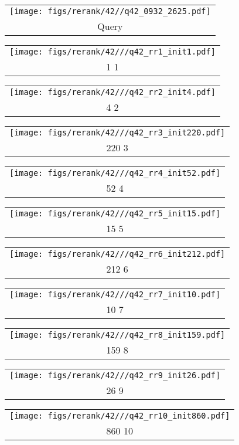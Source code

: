 \begin{figure*}[t]
\begin{tabular}{@{\sssp}c@{\sssp}}\texttt{[image: figs/rerank/42//q42\_0932\_2625.pdf]}\\Query\\ \end{tabular} 
\begin{tabular}{@{\sssp}c@{\sssp}}\texttt{[image: figs/rerank/42///q42\_rr1\_init1.pdf]}\\1  1\\ \end{tabular} 
\begin{tabular}{@{\sssp}c@{\sssp}}\texttt{[image: figs/rerank/42///q42\_rr2\_init4.pdf]}\\4  2\\ \end{tabular} 
\begin{tabular}{@{\sssp}c@{\sssp}}\texttt{[image: figs/rerank/42///q42\_rr3\_init220.pdf]}\\220  3\\ \end{tabular} 
\begin{tabular}{@{\sssp}c@{\sssp}}\texttt{[image: figs/rerank/42///q42\_rr4\_init52.pdf]}\\52  4\\ \end{tabular} 
\begin{tabular}{@{\sssp}c@{\sssp}}\texttt{[image: figs/rerank/42///q42\_rr5\_init15.pdf]}\\15  5\\ \end{tabular} 
\begin{tabular}{@{\sssp}c@{\sssp}}\texttt{[image: figs/rerank/42///q42\_rr6\_init212.pdf]}\\212  6\\ \end{tabular} 
\begin{tabular}{@{\sssp}c@{\sssp}}\texttt{[image: figs/rerank/42///q42\_rr7\_init10.pdf]}\\10  7\\ \end{tabular} 
\begin{tabular}{@{\sssp}c@{\sssp}}\texttt{[image: figs/rerank/42///q42\_rr8\_init159.pdf]}\\159  8\\ \end{tabular} 
\begin{tabular}{@{\sssp}c@{\sssp}}\texttt{[image: figs/rerank/42///q42\_rr9\_init26.pdf]}\\26  9\\ \end{tabular} 
\begin{tabular}{@{\sssp}c@{\sssp}}\texttt{[image: figs/rerank/42///q42\_rr10\_init860.pdf]}\\860  10\\ \end{tabular}  


\end{figure*}
